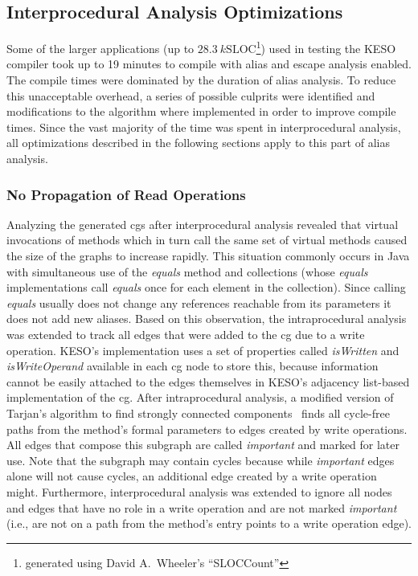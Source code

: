 		\subsection{Interprocedural Analysis Optimizations}
			\label{subsec:ea:improve:opt}
			Some of the larger applications (up to $28.3~k\mathrm{SLOC}$\footnote{generated using David A.\ Wheeler's
			\enquote{SLOCCount}}) used in testing the KESO compiler took up to 19 minutes to compile with alias and escape
			analysis enabled. The compile times were dominated by the duration of alias analysis. To reduce this unacceptable
			overhead, a series of possible culprits were identified and modifications to the algorithm where implemented in
			order to improve compile times. Since the vast majority of the time was spent in interprocedural analysis, all
			optimizations described in the following sections apply to this part of alias analysis.

			\subsubsection{No Propagation of Read Operations}
				\label{subsub:ea:improve:opt:writeonly}
				Analyzing the generated \glspl{cg} after interprocedural analysis revealed that virtual invocations of methods
				which in turn call the same set of virtual methods caused the size of the graphs to increase rapidly. This
				situation commonly occurs in Java with simultaneous use of the \emph{equals} method and collections (whose
				\emph{equals} implementations call \emph{equals} once for each element in the collection). Since calling
				\emph{equals} usually does not change any references reachable from its parameters it does not add new aliases.
				Based on this observation, the intraprocedural analysis was extended to track all edges that were added to the
				\gls{cg} due to a write operation. KESO's implementation uses a set of properties called \emph{isWritten} and
				\emph{isWriteOperand} available in each \acrlong{cg} node to store this, because information cannot be easily
				attached to the edges themselves in KESO's adjacency list-based implementation of the \gls{cg}. After
				intraprocedural analysis, a modified version of Tarjan's algorithm to find strongly connected
				components~\cite{tarjan:72:lga} finds all cycle-free paths from the method's formal parameters to edges created
				by write operations. All edges that compose this subgraph are called \emph{important} and marked for later use.
				Note that the subgraph may contain cycles because while \emph{important} edges alone will not cause cycles, an
				additional edge created by a write operation might. Furthermore, interprocedural analysis was extended to ignore
				all nodes and edges that have no role in a write operation and are not marked \emph{important} (i.e., are not on
				a path from the method's entry points to a write operation edge).

